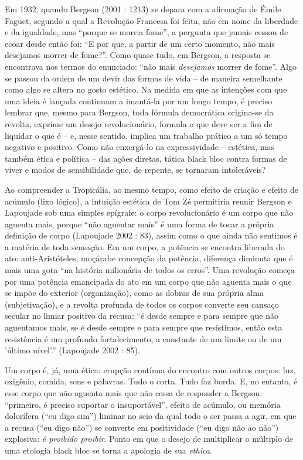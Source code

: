 Em 1932, quando Bergson (2001 : 1213) se depara com a afirmação de Émile
Faguet, segundo a qual a Revolução Francesa foi feita, não em nome da
liberdade e da igualdade, mas ``porque se morria fome'', a pergunta que
jamais cessou de ecoar desde então foi: ``E por que, a partir de um
certo momento, não mais desejamos morrer de fome?''. Como quase tudo, em
Bergson, a resposta se encontrava nos termos do enunciado: ``não mais
\emph{desejamos }morrer de fome''. Algo se passou da ordem de um devir
das formas de vida -- de maneira semelhante como algo se altera no gosto
estético. Na medida em que as intenções com que uma ideia é lançada
continuam a imantá-la por um longo tempo, é preciso lembrar que, mesmo
para Bergson, toda fórmula democrática origina-se da revolta, exprime um
desejo revolucionário, formula o que deve ser a fim de liquidar o que é
-- e, nesse sentido, implica um trabalho prático a um só tempo negativo
e positivo. Como não enxergá-lo na expressividade -- estética, mas
também ética e política -- das ações diretas, tática black bloc contra
formas de viver e modos de sensibilidade que, de repente, se tornaram
intoleráveis?

Ao compreender a Tropicália, ao mesmo tempo, como efeito de criação e
efeito de acúmulo (lixo lógico), a intuição estética de Tom Zé
permitiria reunir Bergson e Lapoujade sob uma simples epígrafe: o corpo
revolucionário é um corpo que não aguenta mais, porque ``não aguentar
mais'' é uma forma de tocar a própria definição de corpo (Lapoujade 2002
: 83), assim como o que ainda não sentimos é a matéria de toda sensação.
Em um corpo, a potência se encontra liberada do ato: anti-Aristóteles,
moçárabe concepção da potência, diferença diminuta que é mais uma gota
``na história milionária de todos os erros''. Uma revolução começa por
uma potência emancipada do ato em um corpo que não aguenta mais o que se
impõe do exterior (organização), como as dobras de sua própria alma
(subjetivação), e a revolta profunda de todos os corpos converte seu
cansaço secular no limiar positivo da recusa: ``é desde sempre e para
sempre que não aguentamos mais, se é desde sempre e para sempre que
resistimos, então esta resistência é um profundo fortalecimento, a
constante de um limite ou de um 'último nível'.'' (Lapoujade 2002 : 85).

Um corpo é, já, uma ética: erupção contínua do encontro com outros
corpos: luz, oxigênio, comida, sons e palavras. Tudo o corta. Tudo faz
borda. E, no entanto, é esse corpo que não aguenta mais que não cessa de
responder a Bergson: ``primeiro, é preciso suportar o insuportável'',
efeito de acúmulo, ou memória dolorífera (``eu digo sim'') liminar no
seio da qual todo o ser passa a agir, em que a recusa (``eu digo não'')
se converte em positividade (``eu digo não ao não'') explosiva: \emph{é
proibido proibir}. Ponto em que o desejo de multiplicar o múltiplo de
uma etologia black bloc se torna a apologia de sua \emph{ethica}.

